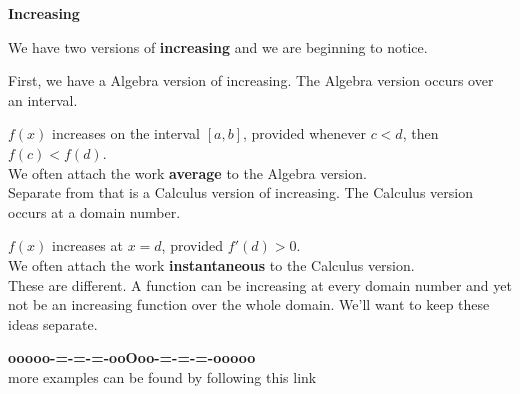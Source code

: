 \documentclass{ximera}
\begin{document}
\begin{warning} \textbf{\textcolor{red!80!black}{Increasing}}



We have two versions of \textbf{increasing} and we are beginning to notice.



First, we have a Algebra version of increasing.  The Algebra version occurs over an interval.  

$f(x)$ increases on the interval $[a,b]$, provided whenever $c < d$, then $f(c) < f(d)$. \\

We often attach the work \textbf{average} to the Algebra version.\\







Separate from that is a Calculus version of increasing. The Calculus version occurs at a domain number.

$f(x)$ increases at $x=d$, provided $f'(d) > 0$. \\

We often attach the work \textbf{instantaneous} to the Calculus version.\\




These are different.  A function can be increasing at every domain number and yet not be an increasing function over the whole domain.  We'll want to keep these ideas separate.





\end{warning}









\begin{center}
\textbf{\textcolor{green!50!black}{ooooo-=-=-=-ooOoo-=-=-=-ooooo}} \\

more examples can be found by following this link\\ 

\end{center}
\end{document}
